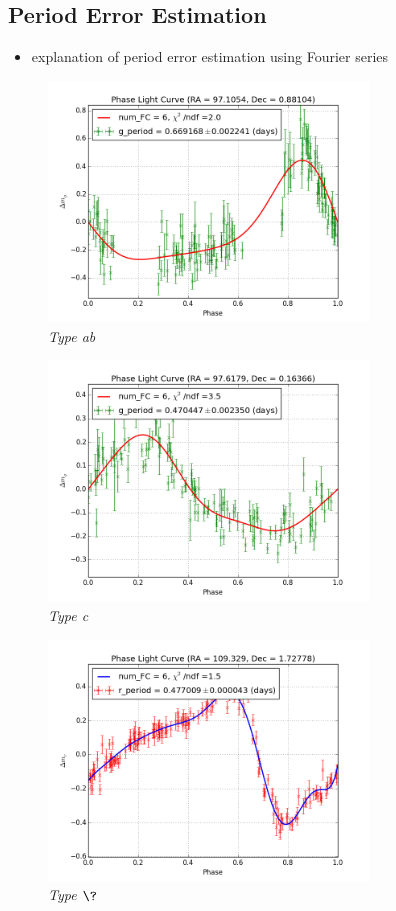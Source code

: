 \documentclass[aps,prb,twocolumn,superscriptaddress]{revtex4-1}
\begin{document}
\iffalse

	\subsection{Period Error Estimation}

	\begin{itemize}
		\item{} explanation of period error estimation using Fourier series
	\end{itemize}

	\begin{figure}[H]
	 \centering
	 	\includegraphics[width=3.35in]{figures/FSP1_g_LC_rrrtest_p5_grp19.png}
	 \caption{\it \small{Type ab}}
	 \label{fig:Typeab}
	\end{figure}

	\begin{figure}[H]
	 \centering
	 	\includegraphics[width=3.35in]{figures/FSP1_g_LC_rrrtest_p5_grp7.png}
	 \caption{\it \small{Type c}}
	 \label{fig:Typec}
	\end{figure}
	
	\begin{figure}[H]
	 \centering
	 	\includegraphics[width=3.35in]{figures/rPLCneg45E_limit2_grp_109+01_09693.png}
	 \caption{\it \small{Type $\?$}}
	 \label{fig:Typeq}
	\end{figure}
\end{document}
